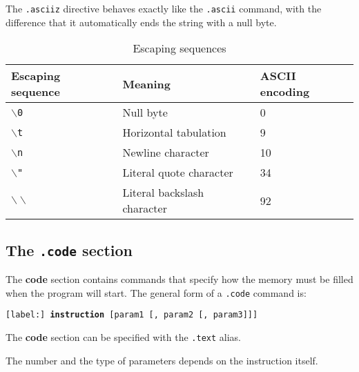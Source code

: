 \documentclass[12pt]{report}
\begin{document}
The \texttt{.asciiz} directive behaves exactly like the \texttt{.ascii} command,
with the difference that it automatically ends the string with a null byte.

\begin{table}[!htb]
	\begin{tabular}{lll}
		\hline
		\hline
		Escaping sequence & Meaning & ASCII encoding\\
		\hline
		\texttt{$\backslash$0} & Null byte & 0\\
		\texttt{$\backslash$t} & Horizontal tabulation & 9\\
		\texttt{$\backslash$n} & Newline character & 10\\
		\texttt{$\backslash$"} & Literal quote character & 34\\
		\texttt{$\backslash\backslash$} & Literal backslash character & 92
	\end{tabular}
	\caption{Escaping sequences}
	\label{table:escaping}
\end{table}

\subsection{The \texttt{.code} section}
The \textbf{code} section contains commands that specify how the memory must be
filled when the program will start. The general form of a \texttt{.code} command
is:

\begin{center}
	\texttt{[label:] \textbf{instruction} [param1 [, param2 [, param3]]]}
\end{center}

The \textbf{code} section can be specified with the \texttt{.text} alias.

The number and the type of parameters depends on the instruction itself.

\end{document}
